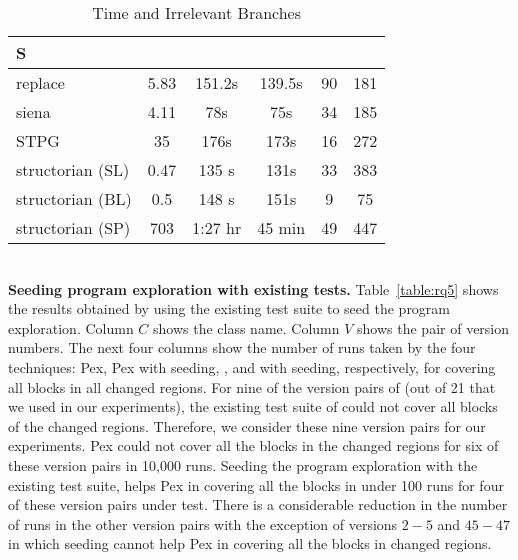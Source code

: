 \begin{table}
\begin{CodeOut}
\begin{center}
\caption {\label{table:all_time}\scriptsize{Time and Irrelevant Branches}}
\begin {tabular} {|l|c|c|c|c|c|}
\hline
S &\CenterCell{$T_{static}(s)$}&\CenterCell{$T_{Pex}$}&\CenterCell{$T_{eXp}$} &\CenterCell{$B_{Irr}$}&\CenterCell{$B_{Tot}$}\\
\hline
replace&5.83&151.2s&139.5s&90&181\\
\hline
siena&4.11&78s&75s&34&185\\
\hline
STPG&35&176s&173s&16&272\\
\hline
structorian (SL)&0.47&135 s&131s&33&383\\
\hline
structorian (BL)&0.5&148 s&151s&9&75\\
\hline
structorian (SP)&703&1:27 hr&45 min&49&447\\
\hline

\end{tabular}
\end{center}
\end{CodeOut}
\end{table}
\\ \textbf{Seeding program exploration with existing tests.} Table~\ref{table:rq5} shows the results obtained by using the existing test suite to seed the program exploration. Column $C$ shows the class name. Column $V$ shows the pair of version numbers. The next four columns show the number of runs taken by the four techniques: Pex, Pex with seeding, , and  with seeding, respectively, for covering all blocks in all changed regions.
For nine of the version pairs of  (out of 21 that we used in our experiments), the existing test suite of  could not cover all blocks of the changed regions. Therefore, we consider these nine version pairs for our experiments.
Pex could not cover all the blocks in the changed regions for six of these version pairs in 10,000 runs. Seeding the program exploration with the existing test suite, helps Pex in covering all the blocks in under 100 runs for four of these version pairs under test. There is a considerable reduction in the number of runs in the other version pairs with the exception of versions $2-5$ and $45-47$ in which seeding cannot help Pex in covering all the blocks in changed regions.


